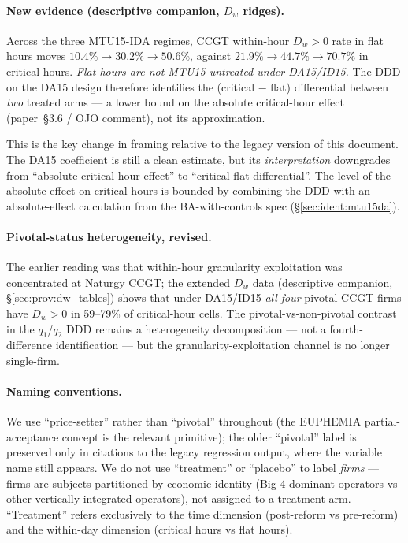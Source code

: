 \documentclass[11pt,a4paper]{article}
\begin{document}
\paragraph{New evidence (descriptive companion, $D_w$ ridges).} Across the three MTU15-IDA regimes, CCGT within-hour $D_w > 0$ rate in flat hours moves $10.4\% \to 30.2\% \to 50.6\%$, against $21.9\% \to 44.7\% \to 70.7\%$ in critical hours. \emph{Flat hours are not MTU15-untreated under DA15/ID15.} The DDD on the DA15 design therefore identifies the (critical $-$ flat) differential between \emph{two} treated arms --- a lower bound on the absolute critical-hour effect (paper~\S3.6 / OJO comment), not its approximation.

This is the key change in framing relative to the legacy version of this document. The DA15 coefficient is still a clean estimate, but its \emph{interpretation} downgrades from ``absolute critical-hour effect'' to ``critical-flat differential''. The level of the absolute effect on critical hours is bounded by combining the DDD with an absolute-effect calculation from the BA-with-controls spec (\S\ref{sec:ident:mtu15da}).

\paragraph{Pivotal-status heterogeneity, revised.} The earlier reading was that within-hour granularity exploitation was concentrated at Naturgy CCGT; the extended $D_w$ data (descriptive companion, \S\ref{sec:prov:dw_tables}) shows that under DA15/ID15 \emph{all four} pivotal CCGT firms have $D_w > 0$ in 59--79\% of critical-hour cells. The pivotal-vs-non-pivotal contrast in the $q_1$/$q_2$ DDD remains a heterogeneity decomposition --- not a fourth-difference identification --- but the granularity-exploitation channel is no longer single-firm.

\paragraph{Naming conventions.} We use ``price-setter'' rather than ``pivotal'' throughout (the EUPHEMIA partial-acceptance concept is the relevant primitive); the older ``pivotal'' label is preserved only in citations to the legacy regression output, where the variable name still appears. We do not use ``treatment'' or ``placebo'' to label \emph{firms} --- firms are subjects partitioned by economic identity (Big-4 dominant operators vs other vertically-integrated operators), not assigned to a treatment arm. ``Treatment'' refers exclusively to the time dimension (post-reform vs pre-reform) and the within-day dimension (critical hours vs flat hours).
\end{document}
